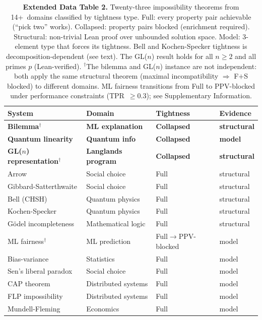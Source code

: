 \documentclass[11pt]{article}
\begin{document}
\begin{table}[h]
\centering
\small
\caption{\textbf{Extended Data Table 2.}
  Twenty-three impossibility theorems from 14+~domains classified by tightness
  type.  Full: every property pair achievable (``pick two'' works).
  Collapsed: property pairs blocked (enrichment required).  Structural:
  non-trivial Lean proof over unbounded solution space.  Model:
  3-element type that forces its tightness.  Bell and Kochen-Specker
  tightness is decomposition-dependent (see text).  The GL($n$) result
  holds for all $n \geq 2$ and all primes $p$ (Lean-verified).
  $^\dagger$The bilemma and GL($n$) instance are not independent:
  both apply the same structural theorem (maximal incompatibility
  $\Rightarrow$ F$+$S blocked) to different domains.  ML fairness
  transitions from Full to PPV-blocked under performance constraints
  (TPR~$\geq 0.3$); see Supplementary Information.}
\label{tab:ed-classification}
\begin{tabular}{@{}llll@{}}
\toprule
\textbf{System} & \textbf{Domain} & \textbf{Tightness} & \textbf{Evidence} \\
\midrule
\textbf{Bilemma}$^\dagger$ & \textbf{ML explanation} & \textbf{Collapsed} & \textbf{structural} \\
\textbf{Quantum linearity} & \textbf{Quantum info} & \textbf{Collapsed} & \textbf{model} \\
\textbf{GL($n$) representation}$^\dagger$ & \textbf{Langlands program} & \textbf{Collapsed} & \textbf{structural} \\
\midrule
Arrow & Social choice & Full & structural \\
Gibbard-Satterthwaite & Social choice & Full & structural \\
Bell (CHSH) & Quantum physics & Full & structural \\
Kochen-Specker & Quantum physics & Full & structural \\
G\"odel incompleteness & Mathematical logic & Full & structural \\
ML fairness$^\dagger$ & ML prediction & Full$\to$PPV-blocked & model \\
Bias-variance & Statistics & Full & model \\
Sen's liberal paradox & Social choice & Full & model \\
CAP theorem & Distributed systems & Full & model \\
FLP impossibility & Distributed systems & Full & model \\
Mundell-Fleming & Economics & Full & model \\

\end{tabular}
\end{table}
\end{document}
